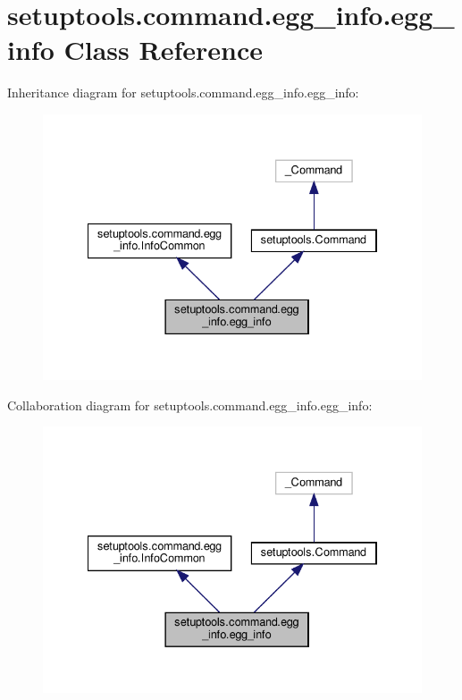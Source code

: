 \hypertarget{classsetuptools_1_1command_1_1egg__info_1_1egg__info}{}\section{setuptools.\+command.\+egg\+\_\+info.\+egg\+\_\+info Class Reference}
\label{classsetuptools_1_1command_1_1egg__info_1_1egg__info}


Inheritance diagram for setuptools.\+command.\+egg\+\_\+info.\+egg\+\_\+info\+:
\nopagebreak
\begin{figure}[H]
\begin{center}
\leavevmode
\includegraphics[width=334pt]{classsetuptools_1_1command_1_1egg__info_1_1egg__info__inherit__graph}
\end{center}
\end{figure}


Collaboration diagram for setuptools.\+command.\+egg\+\_\+info.\+egg\+\_\+info\+:
\nopagebreak
\begin{figure}[H]
\begin{center}
\leavevmode
\includegraphics[width=334pt]{classsetuptools_1_1command_1_1egg__info_1_1egg__info__coll__graph}
\end{center}
\end{figure}
